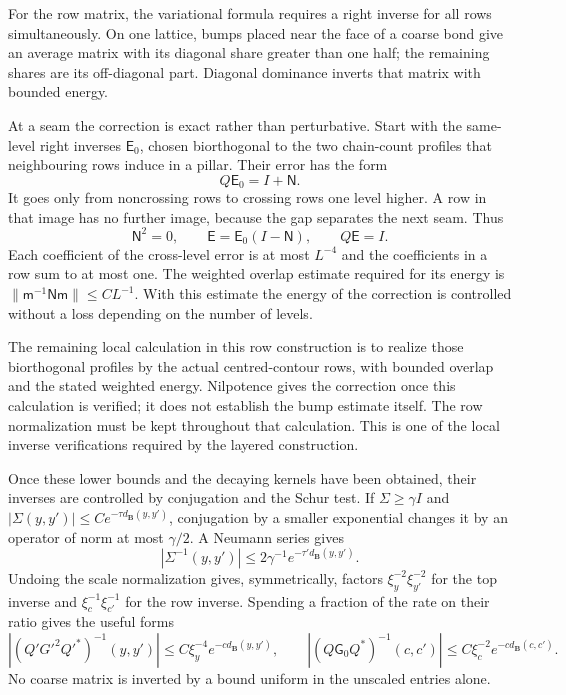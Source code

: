 \documentclass[11pt,letterpaper,reqno]{amsart}
\theoremstyle{definition}
\theoremstyle{remark}
\begin{document}
For the row matrix, the variational formula requires a
right inverse for all rows simultaneously. On one lattice,
bumps placed near the face of a coarse bond give an average
matrix with its diagonal share greater than one half; the
remaining shares are its off-diagonal part. Diagonal
dominance inverts that matrix with bounded energy.

At a seam the correction is exact rather than perturbative.
Start with the same-level right inverses $\mathsf E_0$,
chosen biorthogonal to the two chain-count profiles that
neighbouring rows induce in a pillar. Their error has the
form
\[
 Q\mathsf E_0=I+\mathsf N.
\]
It goes only from noncrossing rows to crossing rows one
level higher. A row in that image has no further image,
because the gap separates the next seam. Thus
\[
 \mathsf N^2=0,\qquad
 \mathsf E=\mathsf E_0(I-\mathsf N),\qquad Q\mathsf E=I.
\]
Each coefficient of the cross-level error is at most
$L^{-4}$ and the coefficients in a row sum to at most one.
The weighted overlap estimate required for its energy is
$\|\mathsf m^{-1}\mathsf N\mathsf m\|\le CL^{-1}$.
With this estimate the energy of the correction is
controlled without a loss depending on the number of levels.

The remaining local calculation in this row construction is
to realize those biorthogonal profiles by the actual
centred-contour rows, with bounded overlap and the stated
weighted energy. Nilpotence gives the correction once this
calculation is verified; it does not establish the bump
estimate itself. The row normalization must be kept throughout
that calculation. This is one of the local inverse
verifications required by the layered construction.

Once these lower bounds and the decaying kernels have been
obtained, their inverses are controlled by conjugation and
the Schur test. If $\Sigma\ge\gamma I$ and
$|\Sigma(y,y')|\le Ce^{-\tau d_{\mathbf B}(y,y')}$,
conjugation by a smaller exponential changes it by an
operator of norm at most $\gamma/2$. A Neumann series gives
\[
 |\Sigma^{-1}(y,y')|\le2\gamma^{-1}
                      e^{-\tau'd_{\mathbf B}(y,y')}.
\]
Undoing the scale normalization gives, symmetrically, factors
$\xi_y^{-2}\xi_{y'}^{-2}$ for the top inverse and
$\xi_c^{-1}\xi_{c'}^{-1}$ for the row inverse. Spending a
fraction of the rate on their ratio gives the useful forms
\[
 |(Q'G'^2Q'^*)^{-1}(y,y')|
             \le C\xi_y^{-4}e^{-cd_{\mathbf B}(y,y')},\qquad
 |(Q\mathsf G_0Q^*)^{-1}(c,c')|
             \le C\xi_c^{-2}e^{-cd_{\mathbf B}(c,c')}.
\]
No coarse matrix is inverted by a bound uniform in the
unscaled entries alone.
\end{document}
